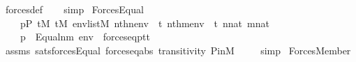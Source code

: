 \begin{isabellebody}
\ forces{\isacharunderscore}{\kern0pt}def\isanewline
\ \ \isamarkupfalse%
\ simp%
\endisatagproof
{\isafoldproof}%
%
\isadelimproof
%
\endisadelimproof
%
\isadelimdocument
%
\endisadelimdocument
%
\isatagdocument
%
\isamarkuptrue%
%
\endisatagdocument
{\isafolddocument}%
%
\isadelimdocument
%
\endisadelimdocument
{}\isamarkupfalse%
\ Forces{\isacharunderscore}{\kern0pt}Equal{\isacharcolon}{\kern0pt}\isanewline
\ \ \isanewline
\ \ \ \ {\isachardoublequoteopen}p{\isasymin}P{\isachardoublequoteclose}\ {\isachardoublequoteopen}t{}{\isasymin}M{\isachardoublequoteclose}\ {\isachardoublequoteopen}t{}{\isasymin}M{\isachardoublequoteclose}\ {\isachardoublequoteopen}env{\isasymin}list{\isacharparenleft}{\kern0pt}M{\isacharparenright}{\kern0pt}{\isachardoublequoteclose}\ {\isachardoublequoteopen}nth{\isacharparenleft}{\kern0pt}n{\isacharcomma}{\kern0pt}env{\isacharparenright}{\kern0pt}\ {\isacharequal}{\kern0pt}\ t{}{\isachardoublequoteclose}\ {\isachardoublequoteopen}nth{\isacharparenleft}{\kern0pt}m{\isacharcomma}{\kern0pt}env{\isacharparenright}{\kern0pt}\ {\isacharequal}{\kern0pt}\ t{}{\isachardoublequoteclose}\ {\isachardoublequoteopen}n{\isasymin}nat{\isachardoublequoteclose}\ {\isachardoublequoteopen}m{\isasymin}nat{\isachardoublequoteclose}\ \isanewline
\ \ \isanewline
\ \ \ \ {\isachardoublequoteopen}{\isacharparenleft}{\kern0pt}p\ {\isasymtturnstile}\ Equal{\isacharparenleft}{\kern0pt}n{\isacharcomma}{\kern0pt}m{\isacharparenright}{\kern0pt}\ env{\isacharparenright}{\kern0pt}\ {\isasymlongleftrightarrow}\ forces{\isacharunderscore}{\kern0pt}eq{\isacharparenleft}{\kern0pt}p{\isacharcomma}{\kern0pt}t{}{\isacharcomma}{\kern0pt}t{}{\isacharparenright}{\kern0pt}{\isachardoublequoteclose}\isanewline
%
\isadelimproof
\ \ \ %
\endisadelimproof
%
\isatagproof
{}\isamarkupfalse%
\ assms\ sats{\isacharunderscore}{\kern0pt}forces{\isacharunderscore}{\kern0pt}Equal\ forces{\isacharunderscore}{\kern0pt}eq{\isacharunderscore}{\kern0pt}abs\ transitivity\ P{\isacharunderscore}{\kern0pt}in{\isacharunderscore}{\kern0pt}M\ \isanewline
\ \ \isamarkupfalse%
\ simp%
\endisatagproof
{\isafoldproof}%
%
\isadelimproof
\isanewline
%
\endisadelimproof
\isanewline
{}\isamarkupfalse%
\ Forces{\isacharunderscore}{\kern0pt}Member{\isacharcolon}{\kern0pt}\isanewline
\ \ \isanewline

\end{isabellebody}
